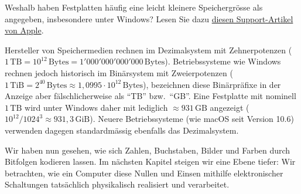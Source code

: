 \begin{mychallenge}\label{mychallenge:festplattengroesse-windows}
	Weshalb haben Festplatten häufig eine leicht kleinere Speichergrösse als angegeben, insbesondere unter Windows? Lesen Sie dazu \href{https://support.apple.com/en-us/102119}{diesen Support-Artikel von Apple}.
	\begin{myanswer}
		Hersteller von Speichermedien rechnen im Dezimalsystem mit Zehnerpotenzen ($1\,\text{TB} = 10^{12}\,\text{Bytes} = 1'000'000'000'000\,\text{Bytes}$). Betriebssysteme wie Windows rechnen jedoch historisch im Binärsystem mit Zweierpotenzen ($1\,\text{TiB} = 2^{40}\,\text{Bytes} \approx 1{,}0995 \cdot 10^{12}\,\text{Bytes}$), bezeichnen diese Binärpräfixe in der Anzeige aber fälschlicherweise als \enquote{TB} bzw.\ \enquote{GB}. Eine Festplatte mit nominell $1\,\text{TB}$ wird unter Windows daher mit lediglich $\approx 931\,\text{GB}$ angezeigt ($10^{12} / 1024^3 \approx 931{,}3\,\text{GiB}$). Neuere Betriebssysteme (wie macOS seit Version 10.6) verwenden dagegen standardmässig ebenfalls das Dezimalsystem.
	\end{myanswer}
\end{mychallenge}

Wir haben nun gesehen, wie sich Zahlen, Buchstaben, Bilder und Farben durch Bitfolgen kodieren lassen. Im nächsten Kapitel steigen wir eine Ebene tiefer: Wir betrachten, wie ein Computer diese Nullen und Einsen mithilfe elektronischer Schaltungen tatsächlich physikalisch realisiert und verarbeitet.
